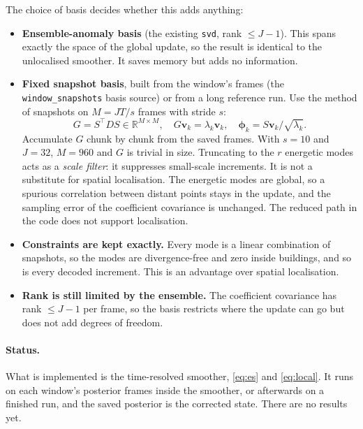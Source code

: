 \documentclass[11pt,a4paper]{article}
\newcommand{\T}{^{\top}}
\newcommand{\R}{\mathbb{R}}
\begin{document}
The choice of basis decides whether this adds anything:
\begin{itemize}
\item \textbf{Ensemble-anomaly basis} (the existing \texttt{svd}, rank
  $\le J-1$). This spans exactly the space of the global update, so the
  result is identical to the unlocalised smoother. It saves memory but adds
  no information.
\item \textbf{Fixed snapshot basis}, built from the window's frames
  (the \texttt{window\_snapshots} basis source) or from a long reference run. Use the method of snapshots on
  $M = JT/s$ frames with stride $s$:
  \begin{equation}
    G = S\T D S \in \R^{M\times M},\quad
    G\bm v_k = \lambda_k \bm v_k,\quad
    \bm\phi_k = S\bm v_k/\sqrt{\lambda_k}.
  \end{equation}
  Accumulate $G$ chunk by chunk from the saved frames. With $s = 10$ and $J = 32$, $M = 960$
  and $G$ is trivial in size. Truncating to the $r$ energetic modes acts as a
  \emph{scale filter}: it suppresses small-scale increments. It is not a
  substitute for spatial localisation. The energetic modes are global, so a
  spurious correlation between distant points stays in the update, and the
  sampling error of the coefficient covariance is unchanged. The reduced path
  in the code does not support localisation.
\item \textbf{Constraints are kept exactly.} Every mode is a linear
  combination of snapshots, so the modes are divergence-free and zero inside
  buildings, and so is every decoded increment. This is an advantage over
  spatial localisation.
\item \textbf{Rank is still limited by the ensemble.} The coefficient
  covariance has rank $\le J-1$ per frame, so the basis restricts where the
  update can go but does not add degrees of freedom.
\end{itemize}

\paragraph{Status.} What is implemented is the time-resolved smoother,
\eqref{eq:es} and \eqref{eq:local}. It runs on each window's posterior frames
inside the smoother, or afterwards on a finished run, and the saved posterior is
the corrected state. There are no results yet.
\end{document}
